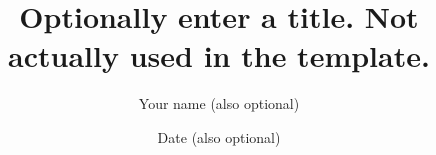 \documentclass[a4paper,12pt,twoside,openany]{book}
\title{Optionally enter a title. Not actually used in the template.}
\author{Your name (also optional)}
\date{Date (also optional)}
\newif\ifthesis
\newif\ifproposal
\begin{document}
\frontmatter
\pagestyle{empty}
\clearpage
\ifthesis
    
            {AuxiliaryPages/front_page_english_phd_thesis_example}
\fi

\ifproposal
    
            {AuxiliaryPages/front_page_hebrew_phd_proposal_example}
\fi

\ifthesis
    \chapter*{Acknowledgments}
        \thispagestyle{empty} %
         \color{teal}
           This is where you should thank your thesis advisor, your fellow students, who worked on the projects with you and were a big part of your studies, your family, and whoever else you want. You should also point out any funding agencies that contributed through scholarships or grants that funded the work.
        \color{black}    
\fi
    

    \renewcommand{\contentsname}{Table of Contents}
    \tableofcontents
    \thispagestyle{empty} %
\clearpage


\ifthesis
        \listoffigures
        \thispagestyle{empty} %
    \clearpage

        \listoftables
        \thispagestyle{empty} %
    \clearpage

        \printglossary[type=\acronymtype]
        \thispagestyle{empty} %
     \clearpage
\fi 
\end{document}
